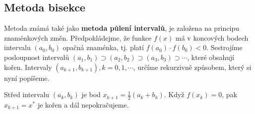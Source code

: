 {    \subsection{Metoda bisekce}
      Metoda známá také jako \textbf{metoda půlení intervalů}, je založena na principu
      zna\-mén\-ko\-vých změn. Předpokládejme, že funkce $f(x)$ má v koncových bodech intervalu
      $(a_0,b_0)$ opačná znaménka, tj. platí $f(a_0 )\cdot f(b_0 )<0$. Sestrojíme posloupnost
      intervalů $(a_1,b_1)\supset(a_2,b_2)\supset(a_3,b_3)\supset\cdots$, které obsahují kořen.
      Intervaly $(a_{k+1},b_{k+1}), k=0,1,\cdots$, určíme rekurzivně způsobem, který si nyní
      popíšeme.
  
      Střed intervalu $(a_k,b_k)$ je bod $x_{k+1}=\frac{1}{2}(a_k+b_k)$. Když $f(x_k)=0$, pak
      $x_{k+1}=x^*$ je kořen a dál nepokračujeme.

} %
